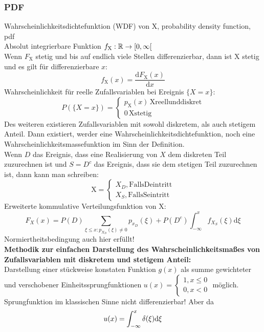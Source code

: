 \documentclass[german]{latex4ei/latex4ei_sheet}
\begin{document}
\subsubsection*{PDF}
Wahrscheinlichkeitsdichtefunktion (WDF) von X, probability density function, pdf\\
Absolut integrierbare Funktion $f_\mathrm{X}: \operatorname{\mathbb R} \to [0,\infty[$\\
Wenn $F_\mathrm{X}$ stetig und bis auf endlich viele Stellen differenzierbar, dann ist $\mathrm{X}$ stetig und es gilt f\"ur differenzierbare $x$:
\[f_\mathrm{X}(x)=\frac{\mathrm{d} F_\mathrm{X}(x)}{\mathrm{d} x}\]
Wahrscheinlichkeit f\"ur reelle Zufallsvariablen bei Ereignis $\{X=x\}$:\\
\[P(\{X=x\})=\begin{cases} p_\mathrm{X}(x) \, \mathrm{X reell und diskret} \\ 0 \, \mathrm{X stetig} \end{cases}\]
Des weiteren existieren Zufallsvariablen mit sowohl diskretem, als auch stetigem Anteil. Dann existiert, werder eine Wahrscheinlichkeitsdichtefunktion, noch eine Wahrscheinlichkeitsmassefunktion im Sinn der Definition.\\
Wenn $D$ das Ereignis, dass eine Realisierung von $X$ dem diskreten Teil zuzurechnen ist und $S=D^c$ das Ereignis, dass sie dem stetigen Teil zuzurechnen ist, dann kann man schreiben:\\
\[\mathrm{X}=\begin{cases} X_D , \mathrm{Falls D eintritt} \\ X_S , \mathrm{Falls S eintritt}\end{cases}\]
Erweiterte kommulative Verteilungsfunktion von X:\\
\[F_X(x)=P(D)\sum_{\xi \le x:p_{X_D}(\xi)\neq 0} p_{x_D}(\xi) + P(D^c) \int_{-\infty}^x f_{X_{S}} (\xi) \mathrm{d} \xi\]
Normiertheitsbedingung auch hier erf\"ullt!\\
\textbf{Methodik zur einfachen Darstellung des Wahrscheinlichkeitsma\ss{}es von Zufallsvariablen mit diskretem und stetigem Anteil:}\\
Darstellung einer st\"uckweise konstaten Funktion $g(x)$ als summe gewichteter und verschobener Einheitssprungfunktionen $u(x)=\begin{cases} 1 , x \le 0 \\ 0 , x < 0 \end{cases}$ m\"oglich.\\
	Sprungfunktion im klassischen Sinne nicht differenzierbar! Aber da
	\[u(x)=\int_{-\infty}^x \operatorname{\delta} (\xi) \mathrm{d} \xi\]
\end{document}
